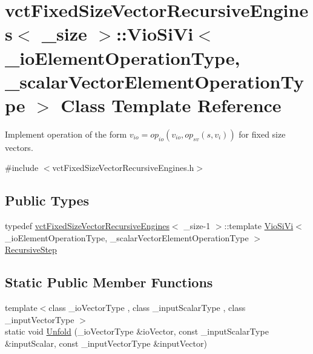 \hypertarget{classvct_fixed_size_vector_recursive_engines_1_1_vio_si_vi}{}\section{vct\+Fixed\+Size\+Vector\+Recursive\+Engines$<$ \+\_\+size $>$\+:\+:Vio\+Si\+Vi$<$ \+\_\+io\+Element\+Operation\+Type, \+\_\+scalar\+Vector\+Element\+Operation\+Type $>$ Class Template Reference}
\label{classvct_fixed_size_vector_recursive_engines_1_1_vio_si_vi}


Implement operation of the form $v_{io} = op_{io}(v_{io}, op_{sv}(s, v_i))$ for fixed size vectors.  




{\ttfamily \#include $<$vct\+Fixed\+Size\+Vector\+Recursive\+Engines.\+h$>$}

\subsection*{Public Types}
\begin{DoxyCompactItemize}
\item 
typedef \hyperlink{classvct_fixed_size_vector_recursive_engines}{vct\+Fixed\+Size\+Vector\+Recursive\+Engines}$<$ \+\_\+size-\/1 $>$\+::template \hyperlink{classvct_fixed_size_vector_recursive_engines_1_1_vio_si_vi}{Vio\+Si\+Vi}$<$ \+\_\+io\+Element\+Operation\+Type, \+\_\+scalar\+Vector\+Element\+Operation\+Type $>$ \hyperlink{classvct_fixed_size_vector_recursive_engines_1_1_vio_si_vi_adb732c70954b6a4f3ddd7b55b273dcc3}{Recursive\+Step}
\end{DoxyCompactItemize}
\subsection*{Static Public Member Functions}
\begin{DoxyCompactItemize}
\item 
{\footnotesize template$<$class \+\_\+io\+Vector\+Type , class \+\_\+input\+Scalar\+Type , class \+\_\+input\+Vector\+Type $>$ }\\static void \hyperlink{classvct_fixed_size_vector_recursive_engines_1_1_vio_si_vi_a894dd5deb6013d579cafdedd69d0be4a}{Unfold} (\+\_\+io\+Vector\+Type \&io\+Vector, const \+\_\+input\+Scalar\+Type \&input\+Scalar, const \+\_\+input\+Vector\+Type \&input\+Vector)
\end{DoxyCompactItemize}


